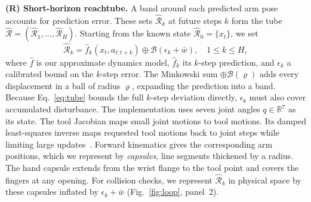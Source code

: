 \documentclass[runningheads]{llncs}
\newcommand{\Rh}{\hat{\mathcal{R}}}
\newcommand{\fhat}{\hat{f}}
\begin{document}
\textbf{(R) Short-horizon reachtube.} A band around each predicted arm pose
accounts for prediction error. These sets $\Rh_k$ at future steps $k$
form the tube $\Rh=(\Rh_1,\dots,\Rh_H)$.
Starting from the known state $\Rh_0=\{x_t\}$, we set
\begin{equation}
\Rh_{k} = \fhat_k\!\left(x_t, a_{t:t+k}\right) \oplus \mathcal{B}\!\left(\epsilon_k + \bar w\right), \quad 1 \le k \le H,
\label{eq:tube}
\end{equation}
where $\fhat$ is our approximate dynamics model, $\fhat_k$ its $k$-step
prediction, and $\epsilon_k$ a calibrated bound on the $k$-step error.
The Minkowski sum $\oplus\mathcal{B}(\varrho)$ adds every displacement in
a ball of radius $\varrho$, expanding the prediction into a band.
Because Eq.~\eqref{eq:tube} bounds the full $k$-step deviation directly,
$\epsilon_k$ must also cover accumulated disturbance.
The implementation uses seven joint angles $q\in\mathbb{R}^7$ as its state.
The tool Jacobian maps small joint motions to tool motions. Its damped
least-squares inverse maps requested tool motions back to joint steps
while limiting large updates~\cite{nakamura1986inverse}.
Forward kinematics gives the corresponding arm positions, which we
represent by \emph{capsules}, line segments thickened by a radius. The hand capsule extends from the wrist flange to the tool point
and covers the fingers at any opening. For collision checks, we represent
$\Rh_k$ in physical space by these capsules inflated by
$\epsilon_k+\bar w$ (Fig.~\ref{fig:loop}, panel~2).
\end{document}
